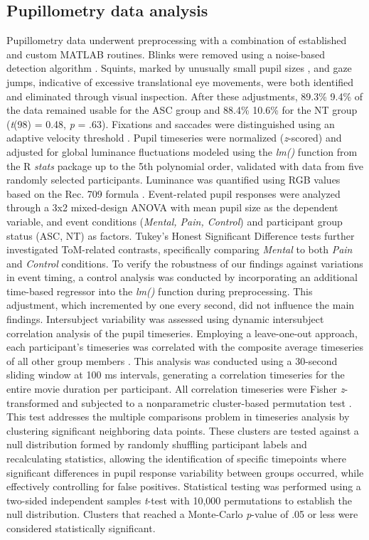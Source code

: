 \subsection*{Pupillometry data analysis}
Pupillometry data underwent preprocessing with a combination of established and custom MATLAB routines. Blinks were removed using a noise-based detection algorithm \citep{hershman2018}. Squints, marked by unusually small pupil sizes \citep{mathot2018}, and gaze jumps, indicative of excessive translational eye movements, were both identified and eliminated through visual inspection. After these adjustments, 89.3\% \textpm{} 9.4\% of the data remained usable for the ASC group and 88.4\% \textpm{} 10.6\% for the NT group (\textit{t}(98) = 0.48, \textit{p} = .63). Fixations and saccades were distinguished using an adaptive velocity threshold \citep{nystrom2010}. Pupil timeseries were normalized (\textit{z}-scored) and adjusted for global luminance fluctuations modeled using the \textit{lm()} function from the R \textit{stats} package \citep{bates2015} up to the 5th polynomial order, validated with data from five randomly selected participants. Luminance was quantified using RGB values based on the Rec. 709 formula \citep{itu2002}. 
Event-related pupil responses were analyzed through a 3x2 mixed-design ANOVA with mean pupil size as the dependent variable, and event conditions (\textit{Mental, Pain, Control}) and participant group status (ASC, NT) as factors. Tukey's Honest Significant Difference tests further investigated ToM-related contrasts, specifically comparing \textit{Mental} to both \textit{Pain} and \textit{Control} conditions. To verify the robustness of our findings against variations in event timing, a control analysis was conducted by incorporating an additional time-based regressor into the \textit{lm()} function during preprocessing. This adjustment, which incremented by one every second, did not influence the main findings.
Intersubject variability was assessed using dynamic intersubject correlation analysis of the pupil timeseries. Employing a leave-one-out approach, each participant's timeseries was correlated with the composite average timeseries of all other group members \citep{nastase2019}. This analysis was conducted using a 30-second sliding window at 100 ms intervals, generating a correlation timeseries for the entire movie duration per participant. All correlation timeseries were Fisher \textit{z}-transformed and subjected to a nonparametric cluster-based permutation test \citep{maris2007}. This test addresses the multiple comparisons problem in timeseries analysis by clustering significant neighboring data points. These clusters are tested against a null distribution formed by randomly shuffling participant labels and recalculating statistics, allowing the identification of specific timepoints where significant differences in pupil response variability between groups occurred, while effectively controlling for false positives. Statistical testing was performed using a two-sided independent samples \textit{t}-test with 10,000 permutations to establish the null distribution. Clusters that reached a Monte-Carlo \textit{p}-value of .05 or less were considered statistically significant.

